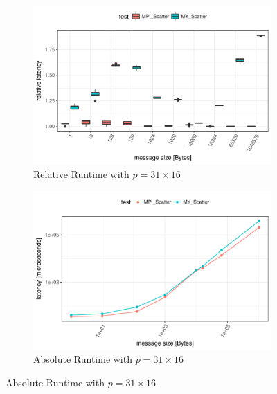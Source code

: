 \begin{figure}[H]
    \centering
    
    \begin{subfigure}[b]{0.49\textwidth}
        \includegraphics[width=\textwidth]{../benchmarks/mpich/divide_conquer/scatter_31/rel_runtime.pdf}
        \caption{Relative Runtime with $p=31 \times 16$}
        \label{fig:Scatter:MPICH:Rel:31}
    \end{subfigure}
    \begin{subfigure}[b]{0.49\textwidth}
        \includegraphics[width=\textwidth]{../benchmarks/mpich/divide_conquer/scatter_31/runtime.pdf}
        \caption{Absolute Runtime with $p=31 \times 16$}
        \label{fig:Scatter:MPICH:Abs:31}
    \end{subfigure}
    

\end{figure}
